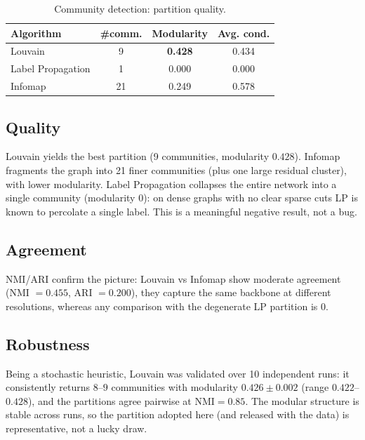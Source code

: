\begin{table}[h]
  \centering\small
  \setlength{\tabcolsep}{4pt}
  \caption{Community detection: partition quality.}
  \label{tab:cd}
  \begin{tabular}{lccc}
    \toprule
    Algorithm & \#comm. & Modularity & Avg. cond. \\
    \midrule
    Louvain           & 9  & \textbf{0.428} & 0.434 \\
    Label Propagation & 1  & 0.000 & 0.000 \\
    Infomap           & 21 & 0.249 & 0.578 \\
    \bottomrule
  \end{tabular}
\end{table}

\subsection{Quality}
Louvain yields the best partition (9 communities, modularity $0.428$). Infomap fragments the graph into 21 finer communities
(plus one large residual cluster), with lower modularity. Label Propagation collapses the entire network into a single community (modularity $0$): on dense graphs with no clear sparse cuts LP is known to percolate a single label. This is a meaningful negative result, not a bug.

\subsection{Agreement}
NMI/ARI confirm the picture: Louvain vs Infomap show moderate agreement (NMI $=0.455$, ARI $=0.200$), they capture the same
backbone at different resolutions, whereas any comparison with the degenerate LP partition is $0$.

\subsection{Robustness}
Being a stochastic heuristic, Louvain was validated over 10 independent runs: it consistently returns $8$--$9$ communities with modularity $0.426\pm0.002$ (range $0.422$--$0.428$), and the partitions agree pairwise at $\mathrm{NMI}=0.85$. The modular structure is stable across runs, so the partition adopted here (and released with the data) is representative, not a lucky draw.

